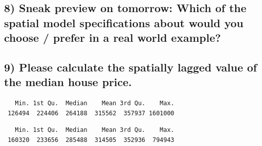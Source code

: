 \documentclass[
  letterpaper,
]{scrbook}
\newenvironment{Shaded}{\begin{snugshade}}{\end{snugshade}}
\newcommand{\AttributeTok}[1]{\textcolor[rgb]{0.40,0.45,0.13}{#1}}
\newcommand{\CommentTok}[1]{\textcolor[rgb]{0.37,0.37,0.37}{#1}}
\newcommand{\FunctionTok}[1]{\textcolor[rgb]{0.28,0.35,0.67}{#1}}
\newcommand{\NormalTok}[1]{\textcolor[rgb]{0.00,0.23,0.31}{#1}}
\newcommand{\OtherTok}[1]{\textcolor[rgb]{0.00,0.23,0.31}{#1}}
\newcommand{\SpecialCharTok}[1]{\textcolor[rgb]{0.37,0.37,0.37}{#1}}
\begin{document}
\hypertarget{sneak-preview-on-tomorrow-which-of-the-spatial-model-specifications-about-would-you-choose-prefer-in-a-real-world-example}{%
\subsection{8) Sneak preview on tomorrow: Which of the spatial model
specifications about would you choose / prefer in a real world
example?}\label{sneak-preview-on-tomorrow-which-of-the-spatial-model-specifications-about-would-you-choose-prefer-in-a-real-world-example}}

\hypertarget{please-calculate-the-spatially-lagged-value-of-the-median-house-price.}{%
\subsection{9) Please calculate the spatially lagged value of the median
house
price.}\label{please-calculate-the-spatially-lagged-value-of-the-median-house-price.}}

\begin{Shaded}
\end{Shaded}

\begin{verbatim}
   Min. 1st Qu.  Median    Mean 3rd Qu.    Max. 
 126494  224406  264188  315562  357937 1601000 
\end{verbatim}

\begin{Shaded}
\end{Shaded}

\begin{verbatim}
   Min. 1st Qu.  Median    Mean 3rd Qu.    Max. 
 160320  233656  285488  314505  352936  794943 
\end{verbatim}
\end{document}
